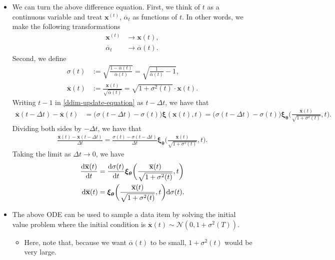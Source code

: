 \documentclass[10pt]{article}
\newcommand{\dee}{\mathrm{d}}
\newcommand{\ve}[1]{\mathbf{#1}}
\newcommand{\ves}[1]{\boldsymbol{#1}}
\newcommand{\mcal}[1]{\mathcal{#1}}
\begin{document}
\begin{itemize}
  \item We can turn the above difference equation. First, we think of $t$ as a continuous variable and treat $\ve{x}^{(t)}$, $\overline{\alpha}_t$ as functions of $t$. In other words, we make the following transformations
  \begin{align*}
    \ve{x}^{(t)} &\rightarrow \ve{x}(t),\\
    \overline{\alpha}_t &\rightarrow \overline{\alpha}(t).
  \end{align*}
  Second, we define
  \begin{align*}
    \sigma(t) &:= \sqrt{\frac{1 - \overline{\alpha}(t)}{\overline{\alpha}(t)}} = \sqrt{\frac{1}{\overline{\alpha}(t)} - 1}, \\
    \overline{\ve{x}}(t)
    &:= \frac{\ve{x}(t)}{\sqrt{\overline{\alpha}(t)}} = \sqrt{1 + \sigma^2(t)} \cdot \ve{x}(t).    
  \end{align*}
  Writing $t-1$ in \eqref{ddim-update-equation} as $t - \Delta t$, we have that
  \begin{align*}
    \overline{\ve{x}}(t - \Delta t) - \overline{\ve{x}}(t)
    &= \big( \sigma(t - \Delta t) - \sigma(t) \big) \ves{\xi}(\ve{x}(t), t)
    = \big( \sigma(t - \Delta t) - \sigma(t) \big) \ves{\xi}_{\ves{\theta}}\bigg(\frac{\overline{\ve{x}}(t)}{\sqrt{1 + \sigma^2(t)}}, t\bigg).
  \end{align*}
  Dividing both sides by $-\Delta t$, we have that
  \begin{align*}
    \frac{\overline{\ve{x}}(t) - \overline{\ve{x}}(t - \Delta t)}{\Delta t}
    = \frac{\sigma(t) - \sigma(t - \Delta t)}{\Delta t} \ves{\xi}_{\ves{\theta}}\bigg( \frac{\overline{\ve{x}}(t)}{\sqrt{1 + \sigma^2(t)}}, t \bigg).
  \end{align*}
  Taking the limit as $\Delta t \rightarrow 0$, we have
  \begin{align}
    \frac{\dee \overline{\ve{x}}(t)}{\dee t}
    &= \frac{\dee \sigma(t)}{\dee t} \ves{\xi}_{\ves{\theta}}\bigg( \frac{\overline{\ve{x}}(t)}{\sqrt{1 + \sigma^2(t)}}, t \bigg) \notag \\
    \dee \overline{\ve{x}}(t) &= \ves{\xi}_{\ves{\theta}}\bigg( \frac{\overline{\ve{x}}(t)}{\sqrt{1 + \sigma^2(t)}}, t \bigg) \dee \sigma(t). \label{ddim-ode}
  \end{align}

  \item The above ODE can be used to sample a data item by solving the initial value problem where the initial condition is $\overline{\ve{x}}(t) \sim \mcal{N}(0, 1 + \sigma^2(T))$.
  \begin{itemize}
    \item Here, note that, because we want $\overline{\alpha}(t)$ to be small, $1 + \sigma^2(t)$ would be very large.
  \end{itemize}


\end{itemize}
\end{document}
